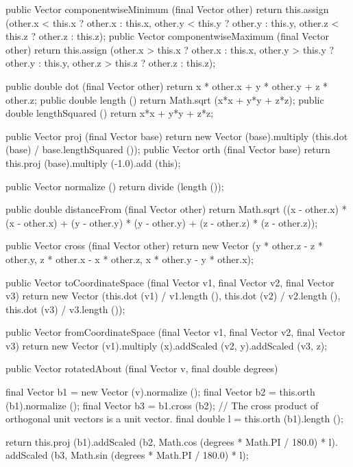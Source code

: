 \documentclass{report}
\begin{document}
\begin{javacode}
{  public Vector componentwiseMinimum (final Vector other) {return this.assign (other.x < this.x ? other.x : this.x,
                                                                               other.y < this.y ? other.y : this.y,
                                                                               other.z < this.z ? other.z : this.z);}
  public Vector componentwiseMaximum (final Vector other) {return this.assign (other.x > this.x ? other.x : this.x,
                                                                               other.y > this.y ? other.y : this.y,
                                                                               other.z > this.z ? other.z : this.z);}

  public double dot (final Vector other) {return x * other.x + y * other.y + z * other.z;}
  public double length ()                {return Math.sqrt (x*x + y*y + z*z);}
  public double lengthSquared ()         {return x*x + y*y + z*z;}

  public Vector proj (final Vector base) {return new Vector (base).multiply (this.dot (base) / base.lengthSquared ());}
  public Vector orth (final Vector base) {return this.proj (base).multiply (-1.0).add (this);}

  public Vector normalize () {return divide (length ());}

  public double distanceFrom (final Vector other) {return Math.sqrt ((x - other.x) * (x - other.x) +
                                                                     (y - other.y) * (y - other.y) +
                                                                     (z - other.z) * (z - other.z));}

  public Vector cross (final Vector other) {return new Vector (y * other.z - z * other.y,
                                                               z * other.x - x * other.z,
                                                               x * other.y - y * other.x);}

  public Vector toCoordinateSpace (final Vector v1, final Vector v2, final Vector v3)
    {return new Vector (this.dot (v1) / v1.length (), this.dot (v2) / v2.length (), this.dot (v3) / v3.length ());}

  public Vector fromCoordinateSpace (final Vector v1, final Vector v2, final Vector v3)
    {return new Vector (v1).multiply (x).addScaled (v2, y).addScaled (v3, z);}

  public Vector rotatedAbout (final Vector v, final double degrees) {
    final Vector b1 = new Vector (v).normalize ();
    final Vector b2 = this.orth (b1).normalize ();
    final Vector b3 = b1.cross (b2);                  // The cross product of orthogonal unit vectors is a unit vector.
    final double l  = this.orth (b1).length ();

    return this.proj (b1).addScaled (b2, Math.cos (degrees * Math.PI / 180.0) * l).
                          addScaled (b3, Math.sin (degrees * Math.PI / 180.0) * l);
  }
}
\end{javacode}
\end{document}
